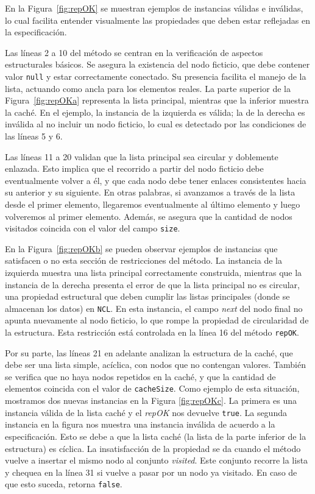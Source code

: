 En la Figura~\ref{fig:repOK} se muestran ejemplos de instancias válidas e inválidas, lo cual facilita entender visualmente las propiedades que deben estar reflejadas en la especificación.

Las líneas 2 a 10 del método se centran en la verificación de aspectos estructurales básicos. Se asegura la existencia del 
nodo ficticio, que debe contener valor \texttt{null} y estar correctamente conectado. Su presencia facilita el manejo de 
la lista, actuando como ancla para los elementos reales. 
La parte superior de la Figura~\ref{fig:repOKa} representa la lista principal, mientras que la inferior muestra la caché. 
En el ejemplo, la instancia de la izquierda es válida; la de la derecha es inválida al no incluir un nodo ficticio, lo cual es detectado por las condiciones de las líneas 5 y 6.


Las líneas 11 a 20 validan que la lista principal sea circular y doblemente enlazada. Esto implica que el recorrido a partir 
del nodo ficticio debe eventualmente volver a él, y que cada nodo debe tener enlaces consistentes hacia su anterior y su 
siguiente. En otras palabras, si avanzamos a través de la lista desde el primer elemento, llegaremos eventualmente al
último elemento y luego volveremos al primer elemento. Además, se asegura que la cantidad de nodos visitados coincida con el valor del campo \texttt{size}.

En la Figura~\ref{fig:repOKb} se pueden observar ejemplos de instancias que satisfacen o no esta sección de restricciones del método.  
La instancia de la izquierda muestra una lista principal correctamente construida, mientras que la instancia de la derecha presenta el error de que la lista principal no es circular,  
una propiedad estructural que deben cumplir las listas principales (donde se almacenan los datos) en \texttt{NCL}.  
En esta instancia, el campo \emph{next} del nodo final no apunta nuevamente al nodo ficticio, lo que rompe la propiedad de circularidad de la estructura.  
Esta restricción está controlada en la línea 16 del método \texttt{repOK}.

Por su parte, las líneas 21 en adelante analizan la estructura de la caché, que debe ser una lista simple, acíclica, con nodos 
que no contengan valores. También se verifica que no haya nodos repetidos en la caché, y que la 
cantidad de elementos coincida con el valor de \texttt{cacheSize}.
Como ejemplo de esta situación, mostramos dos nuevas instancias en la Figura \ref{fig:repOKc}. 
La primera es una instancia válida de la lista caché y el \emph{repOK} nos devuelve \texttt{true}. 
La segunda instancia en la figura nos muestra una instancia inválida de acuerdo a la especificación. 
Esto se debe a que la lista caché (la lista de la parte inferior de la estructura) es cíclica. 
La insatisfacción de la propiedad se da cuando el método vuelve a insertar el mismo nodo al conjunto \emph{visited}. 
Este conjunto recorre la lista y chequea en la línea 31 si vuelve a pasar por un nodo ya visitado. 
En caso de que esto suceda, retorna \texttt{false}. 

